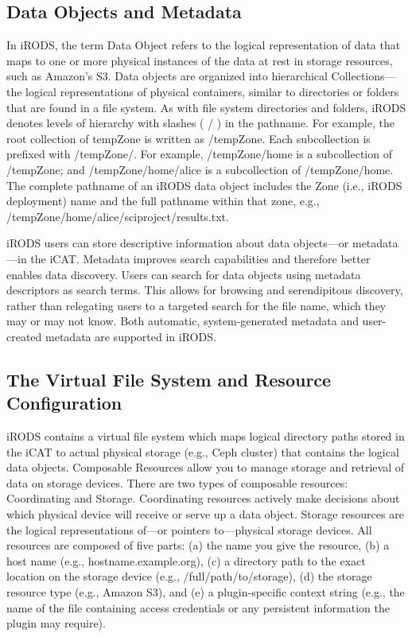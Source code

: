 \documentclass[10pt,oneside]{memoir}
\begin{document}
\subsection{Data Objects and Metadata}

In iRODS, the term Data Object refers to the logical representation of data that maps to one or more physical instances of the data at rest in storage resources, such as Amazon's S3. Data objects are organized into hierarchical Collections---the logical representations of physical containers, similar to directories or folders that are found in a file system. As with file system directories and folders, iRODS denotes levels of hierarchy with slashes ( / ) in the pathname. For example, the root collection of tempZone is written as /tempZone. Each subcollection is prefixed with /tempZone/.  For example, /tempZone/home is a subcollection of /tempZone; and /tempZone/home/alice is a subcollection of /tempZone/home. The complete pathname of an iRODS data object includes the Zone (i.e., iRODS deployment) name and the full pathname within that zone, e.g., /tempZone/home/alice/sciproject/results.txt.

iRODS users can store descriptive information about data objects---or metadata---in the iCAT. Metadata improves search capabilities and therefore better enables data discovery. Users can search for data objects using metadata descriptors as search terms.  This allows for browsing and serendipitous discovery, rather than relegating users to a targeted search for the file name, which they may or may not know. Both automatic, system-generated metadata and user-created metadata are supported in iRODS.

\subsection{The Virtual File System and Resource Configuration}

iRODS contains a virtual file system which maps logical directory paths stored in the iCAT to actual physical storage (e.g., Ceph cluster) that contains the logical data objects. Composable Resources allow you to manage storage and retrieval of data on storage devices. There are two types of composable resources: Coordinating and Storage. Coordinating resources actively make decisions about which physical device will receive or serve up a data object. Storage resources are the logical representations of---or pointers to---physical storage devices. All resources are composed of five parts: (a) the name you give the resource, (b) a host name (e.g., hostname.example.org), (c) a directory path to the exact location on the storage device (e.g., /full/path/to/storage), (d) the storage resource type (e.g., Amazon S3), and (e) a plugin-specific context string (e.g., the name of the file containing access credentials or any persistent information the plugin may require).
\end{document}
